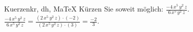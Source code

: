 \begin{MAufgabe}{Kuerzen}{kr, dh, MaTeX}
K\"urzen Sie soweit m\"oglich: $\frac{- 4\, x^5\, y^2\, z}{6\, x^5\, y^2\, z}$.\\ 
\ifLsg\MLoesung
\quad $\frac{- 4\, x^5\, y^2\, z}{6\, x^5\, y^2\, z}=\frac{(2\, x^5\, y^2\, z)\cdot(-2)}{(2\, x^5\, y^2\, z)\cdot(3)}=\frac{-2}{3}$.\else\relax\fi
 \end{MAufgabe}